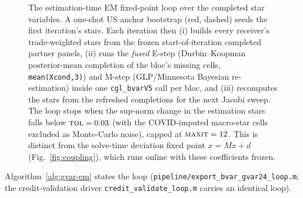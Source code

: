 \documentclass[11pt]{article}
\theoremstyle{definition}
\theoremstyle{remark}
\begin{document}
\begin{figure}[!ht]
\caption{The estimation-time EM fixed-point loop over the completed star
variables. A one-shot US anchor bootstrap (red, dashed) seeds the first
iteration's stars. Each iteration then (i) builds every receiver's
trade-weighted stars from the frozen start-of-iteration completed partner panels,
(ii) runs the \emph{fused} E-step (Durbin--Koopman posterior-mean completion of
the bloc's missing cells, \texttt{mean(Xcond,3)}) and M-step (GLP/Minnesota
Bayesian re-estimation) inside one \texttt{cgl\_bvarV5} call per bloc, and (iii)
recomputes the stars from the refreshed completions for the next Jacobi sweep.
The loop stops when the sup-norm change in the estimation stars falls below
$\textsc{tol}=0.03$ (with the COVID-imputed macro-star cells excluded as
Monte-Carlo noise), capped at $\textsc{maxit}=12$. This is distinct from the
solve-time deviation fixed point $x=Mx+d$ (Fig.~\ref{fig:coupling}), which runs
online with these coefficients frozen.}
\label{fig:gvar-em}
\end{figure}

Algorithm~\ref{alg:gvar-em} states the loop
(\texttt{pipeline/export\_bvar\_gvar24\_loop.m}; the credit-validation driver
\texttt{credit\_validate\_loop.m} carries an identical loop).
\end{document}
